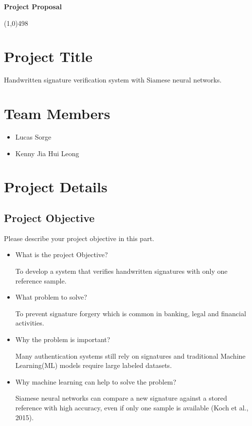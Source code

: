 \documentclass[11pt]{article}
\begin{document}
\begin{center}
{\Large \textbf{Project Proposal}}\\
\end{center}

\linethickness{1mm}\line(1,0){498}



\section{Project Title}

Handwritten signature verification system with Siamese neural networks.

\section{Team Members}

\begin{itemize}
  \item Lucas Sorge
  \item Kenny Jia Hui Leong
\end{itemize}

\section{Project Details}

\subsection{Project Objective}

Please describe your project objective in this part.

\begin{itemize}
  \item What is the project Objective?
  \begin{itemize}
      To develop a system that verifies handwritten signatures with only one reference sample.
  \end{itemize}
  \item What problem to solve?
  \begin{itemize}
      To prevent signature forgery which is common in banking, legal and financial activities.
  \end{itemize}
  \item Why the problem is important?
  \begin{itemize}
      Many authentication systems still rely on signatures and traditional Machine Learning(ML) models require large labeled datasets.
  \end{itemize}
  \item Why machine learning can help to solve the problem?
  \begin{itemize}
      Siamese neural networks can compare a new signature against a stored reference with high accuracy, even if only one sample is available (Koch et al., 2015).
  \end{itemize}
\end{itemize}
\end{document}
